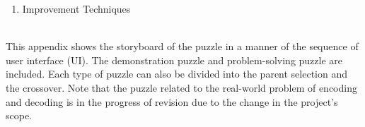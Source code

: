 \documentclass[12pt,oneside,openright,a4paper]{cpe-english-project}
\begin{document}
\begin{itemize}
\begin{enumerate}
		\item Improvement Techniques \\
		\begin{minipage}[c]{\textwidth}\centering {}  \end{minipage}
	\end{enumerate}
\end{itemize}
\newpage


 \label{appendix:puzzle-storyboard} \\
This appendix shows the storyboard of the puzzle in a manner of the sequence of user interface (UI). The demonstration puzzle and problem-solving puzzle are included. Each type of puzzle can also be divided into the parent selection and the crossover. Note that the puzzle related to the real-world problem of encoding and decoding is in the progress of revision due to the change in the project's scope.
\end{document}
